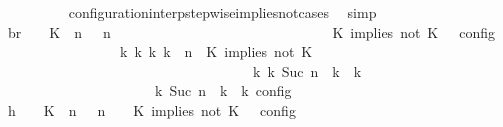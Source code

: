 \begin{isabellebody}
\ \ \ \ \ \ \ \ \isamarkupfalse%
\ configuration{\isacharunderscore}interp{\isacharunderscore}stepwise{\isacharunderscore}implies{\isacharunderscore}not{\isacharunderscore}cases\ \isamarkupfalse%
\ simp\isanewline
\ \ \ \ \ \ \isamarkupfalse%
\ \isamarkupfalse%
\ br{}{\isacharcolon}\ {\isacartoucheopen}{\isasymrho}\ {\isasymin}\ {\isasymlbrakk}\ {\isacharparenleft}{\isacharparenleft}K\ {\isasymnot}{\isasymUp}\ n{\isacharparenright}\ {\isacharhash}\ {\isasymGamma}{\isacharparenright}{\isacharcomma}\ n\isanewline
\ \ \ \ \ \ \ \ \ \ \ \ \ \ \ \ \ \ \ \ \ \ \ \ \ \ \ \ {\isasymturnstile}\ {\isasymPsi}\ {\isasymtriangleright}\ {\isacharparenleft}{\isacharparenleft}K\ implies\ not\ K\ {\isacharhash}\ {\isasymPhi}{\isacharparenright}\ {\isasymrbrakk}\isactrlsub c\isactrlsub o\isactrlsub n\isactrlsub f\isactrlsub i\isactrlsub g\isanewline
\ \ \ \ \ \ \ \ \ \ \ \ \ \ \ \ {\isasymLongrightarrow}\ {\isasymexists}{\isasymGamma}\isactrlsub k\ {\isasymPsi}\isactrlsub k\ {\isasymPhi}\isactrlsub k\ k{\isachardot}\ {\isacharparenleft}{\isacharparenleft}{\isasymGamma}{\isacharcomma}\ n\ {\isasymturnstile}\ {\isacharparenleft}{\isacharparenleft}K\ implies\ not\ K\ {\isacharhash}\ {\isasymPsi}{\isacharparenright}\ {\isasymtriangleright}\ {\isasymPhi}{\isacharparenright}\isanewline
\ \ \ \ \ \ \ \ \ \ \ \ \ \ \ \ \ \ \ \ \ \ \ \ \ \ \ \ \ \ \ \ \ \ \ \ {\isasymhookrightarrow}\isactrlbsup k\isactrlesup \ {\isacharparenleft}{\isasymGamma}\isactrlsub k{\isacharcomma}\ Suc\ n\ {\isasymturnstile}\ {\isasymPsi}\isactrlsub k\ {\isasymtriangleright}\ {\isasymPhi}\isactrlsub k{\isacharparenright}{\isacharparenright}\isanewline
\ \ \ \ \ \ \ \ \ \ \ \ \ \ \ \ \ \ {\isasymand}\ {\isasymrho}\ {\isasymin}\ {\isasymlbrakk}\ {\isasymGamma}\isactrlsub k{\isacharcomma}\ Suc\ n\ {\isasymturnstile}\ {\isasymPsi}\isactrlsub k\ {\isasymtriangleright}\ {\isasymPhi}\isactrlsub k\ {\isasymrbrakk}\isactrlsub c\isactrlsub o\isactrlsub n\isactrlsub f\isactrlsub i\isactrlsub g{\isacartoucheclose}\isanewline
\ \ \ \ \ \ \isamarkupfalse%
\ {\isacharminus}\isanewline
\ \ \ \ \ \ \ \ \isamarkupfalse%
\ h{}{\isacharcolon}\ {\isacartoucheopen}{\isasymrho}\ {\isasymin}\ {\isasymlbrakk}\ {\isacharparenleft}{\isacharparenleft}K\ {\isasymnot}{\isasymUp}\ n{\isacharparenright}\ {\isacharhash}\ {\isasymGamma}{\isacharparenright}{\isacharcomma}\ n\ {\isasymturnstile}\ {\isasymPsi}\ {\isasymtriangleright}\ {\isacharparenleft}{\isacharparenleft}K\ implies\ not\ K\ {\isacharhash}\ {\isasymPhi}{\isacharparenright}\ {\isasymrbrakk}\isactrlsub c\isactrlsub o\isactrlsub n\isactrlsub f\isactrlsub i\isactrlsub g{\isacartoucheclose}\isanewline

\end{isabellebody}

